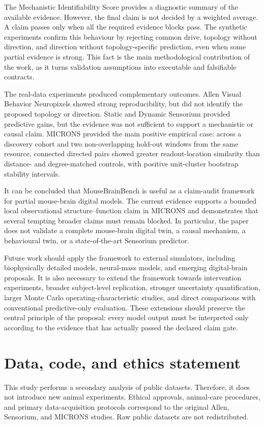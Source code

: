 \documentclass[a4paper,fleqn]{cas-sc}
\begin{document}
The Mechanistic Identifiability Score provides a diagnostic summary of the
available evidence. However, the final claim is not decided by a weighted
average. A claim passes only when all the required evidence blocks pass. The
synthetic experiments confirm this behaviour by rejecting common drive, topology
without direction, and direction without topology-specific prediction, even when
some partial evidence is strong. This fact is the main methodological
contribution of the work, as it turns validation assumptions into executable and
falsifiable contracts.

The real-data experiments produced complementary outcomes. Allen Visual Behavior
Neuropixels showed strong reproducibility, but did not identify the proposed
topology or direction. Static and Dynamic Sensorium provided predictive gains,
but the evidence was not sufficient to support a mechanistic or causal claim.
MICRONS provided the main positive empirical case: across a discovery cohort and two
non-overlapping hold-out windows from the same resource, connected directed
pairs showed greater readout-location similarity than distance- and
degree-matched controls, with positive unit-cluster bootstrap stability intervals.

It can be concluded that MouseBrainBench is useful as a claim-audit framework
for partial mouse-brain digital models. The current evidence supports a bounded
local observational structure--function claim in MICRONS and demonstrates that
several tempting broader claims must remain blocked. In particular, the paper
does not validate a complete mouse-brain digital twin, a causal mechanism, a
behavioural twin, or a state-of-the-art Sensorium predictor.

Future work should apply the framework to external simulators, including
biophysically detailed models, neural-mass models, and emerging digital-brain
proposals. It is also necessary to extend the framework towards intervention
experiments, broader subject-level replication, stronger uncertainty
quantification, larger Monte Carlo operating-characteristic studies, and direct
comparisons with conventional predictive-only evaluation. These extensions should preserve the central principle of the
proposal: every model output must be interpreted only according to the evidence
that has actually passed the declared claim gate.

\section{Data, code, and ethics statement}
\label{sec:data-code-availability}
This study performs a secondary analysis of public datasets. Therefore, it does
not introduce new animal experiments. Ethical approvals, animal-care procedures, and primary
data-acquisition protocols correspond to the original Allen, Sensorium, and
MICRONS studies. Raw public datasets are not redistributed.
\end{document}
